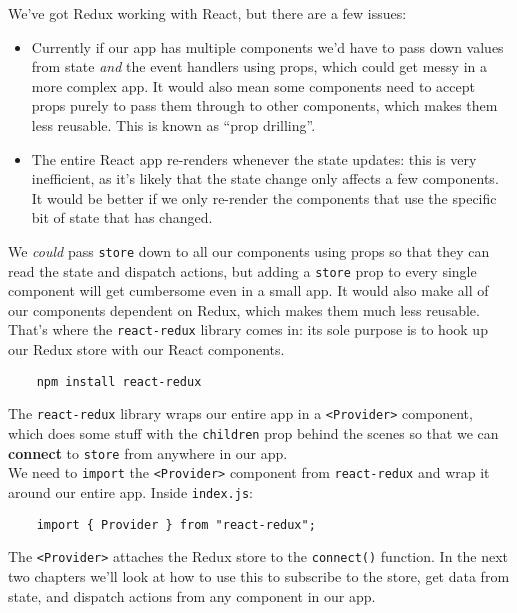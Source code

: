 We've got Redux working with React, but there are a few issues:

\begin{itemize}
    \item Currently if our app has multiple components we'd have to pass down values from state \textit{and} the event handlers using props, which could get messy in a more complex app. It would also mean some components need to accept props purely to pass them through to other components, which makes them less reusable. This is known as ``prop drilling''.
    \item The entire React app re-renders whenever the state updates: this is very inefficient, as it's likely that the state change only affects a few components. It would be better if we only re-render the components that use the specific bit of state that has changed.
\end{itemize}

We \textit{could} pass \texttt{store} down to all our components using props so that they can read the state and dispatch actions, but adding a \texttt{store} prop to every single component will get cumbersome even in a small app. It would also make all of our components dependent on Redux, which makes them much less reusable.
\\

That's where the \texttt{react-redux} library comes in: its sole purpose is to hook up our Redux store with our React components.

\begin{verbatim}
    npm install react-redux
\end{verbatim}

The \texttt{react-redux} library wraps our entire app in a \texttt{<Provider>} component, which does some stuff with the \texttt{children} prop behind the scenes so that we can \textbf{connect} to \texttt{store} from anywhere in our app.
\\

We need to \texttt{import} the \texttt{<Provider>} component from \texttt{react-redux} and wrap it around our entire app. Inside \texttt{index.js}:

\begin{verbatim}
    import { Provider } from "react-redux";
\end{verbatim}


The \texttt{<Provider>} attaches the Redux store to the \texttt{connect()} function. In the next two chapters we'll look at how to use this to subscribe to the store, get data from state, and dispatch actions from any component in our app.
\\

